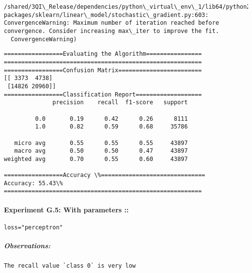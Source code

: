 \documentclass[11pt]{article}
\begin{document}
    \begin{Verbatim}[commandchars=\\\{\}]
/shared/3QI\_Release/dependencies/python\_virtual\_env\_1/lib64/python2.7/site-packages/sklearn/linear\_model/stochastic\_gradient.py:603: ConvergenceWarning: Maximum number of iteration reached before convergence. Consider increasing max\_iter to improve the fit.
  ConvergenceWarning)

    \end{Verbatim}

    \begin{Verbatim}[commandchars=\\\{\}]
=================Evaluating the Algorithm================
=========================================================
=================Confusion Matrix========================
[[ 3373  4738]
 [14826 20960]]
=================Classification Report===================
              precision    recall  f1-score   support

         0.0       0.19      0.42      0.26      8111
         1.0       0.82      0.59      0.68     35786

   micro avg       0.55      0.55      0.55     43897
   macro avg       0.50      0.50      0.47     43897
weighted avg       0.70      0.55      0.60     43897

=================Accuracy \%==============================
Accuracy: 55.43\%
=========================================================

    \end{Verbatim}

    \paragraph{Experiment G.5: With parameters
::}\label{experiment-g.5-with-parameters}

\begin{verbatim}
loss="perceptron"
\end{verbatim}

\subparagraph{Observations:}\label{observations}

\begin{verbatim}
The recall value `class 0` is very low
\end{verbatim}
\end{document}
